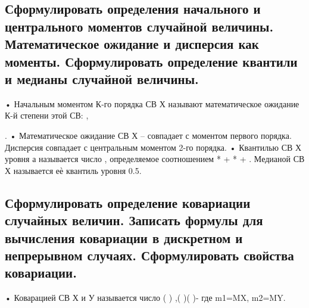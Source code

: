 \subsection{Сформулировать определения начального и центрального моментов случайной величины. Математическое ожидание и дисперсия как моменты. Сформулировать определение квантили и медианы случайной величины.}

• Начальным моментом К-го порядка СВ Х называют математическое ожидание К-й степени этой СВ: ,



.
• Математическое ожидание СВ Х – совпадает с моментом первого порядка. Дисперсия совпадает с центральным моментом 2-го порядка.
• Квантилью СВ Х уровня а называется число , определяемое соотношением *
+ *
+ . Медианой СВ Х
называется еѐ квантиль уровня 0.5.

\subsection{Сформулировать определение ковариации случайных величин. Записать формулы для вычисления ковариации в дискретном и непрерывном случаях. Сформулировать свойства ковариации.}

• Коварацией СВ Х и У называется число ( ) ,( )( )- где m1=MX, m2=MY.
